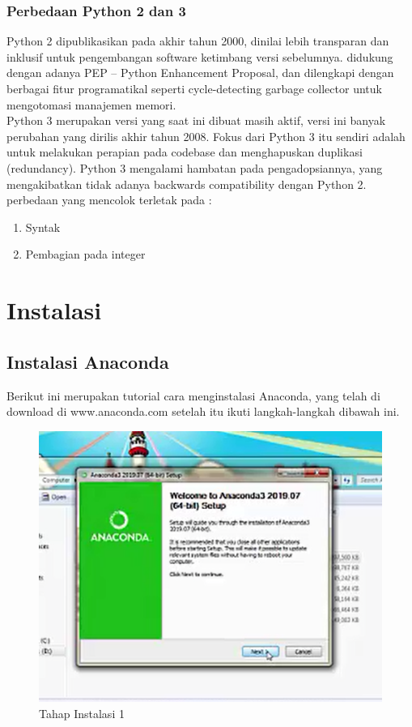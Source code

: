 \subsubsection{Perbedaan Python 2 dan 3}
	Python 2 dipublikasikan pada akhir tahun 2000, dinilai lebih transparan dan inklusif untuk pengembangan software ketimbang versi sebelumnya. didukung dengan adanya PEP – Python Enhancement Proposal, dan dilengkapi dengan berbagai fitur programatikal seperti cycle-detecting garbage collector untuk mengotomasi manajemen memori. 
\\ Python 3 merupakan versi yang saat  ini dibuat masih aktif, versi ini banyak perubahan yang dirilis akhir tahun 2008. Fokus dari Python 3 itu sendiri adalah untuk melakukan perapian pada codebase dan menghapuskan duplikasi (redundancy). Python 3 mengalami hambatan pada pengadopsiannya, yang mengakibatkan tidak adanya backwards compatibility dengan Python 2.
\\	 
perbedaan yang mencolok terletak pada : 
\begin{enumerate}
\item Syntak
\item Pembagian pada integer
\end{enumerate}

\section{Instalasi}
\subsection{Instalasi Anaconda}
Berikut ini merupakan tutorial cara menginstalasi Anaconda, yang telah di download di www.anaconda.com setelah itu ikuti langkah-langkah dibawah ini.

	\begin{figure}
	\includegraphics[scale=0.5]{section/1.png}
	\centering
	\caption{Tahap Instalasi 1}
	\end{figure}
	
